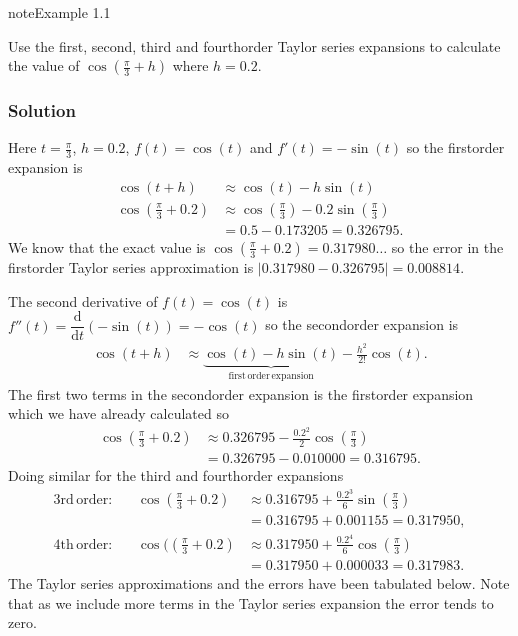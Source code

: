 \documentclass[letterpaper,10pt,english]{jupyterBook}
\begin{document}
\begin{sphinxadmonition}{note}{Example 1.1}

\sphinxAtStartPar
Use the first, second, third and fourth\sphinxhyphen{}order Taylor series expansions to calculate the value of \(\cos\left(\frac{\pi}{3} + h\right)\) where \(h=0.2\).
\subsubsection*{Solution}

\sphinxAtStartPar
Here \(t=\frac{\pi}{3}\), \(h=0.2\), \(f(t) = \cos(t)\) and \(f'(t) = -\sin(t)\) so the first\sphinxhyphen{}order expansion is
\begin{align*}
    \cos(t + h) &\approx \cos(t) - h \sin(t) \\
    \cos\left(\frac{\pi}{3} + 0.2 \right) &\approx \cos\left(\frac{\pi}{3}\right) - 0.2 \sin\left(\frac{\pi}{3}\right)
    \\
    &= 0.5 - 0.173205 = 0.326795.
\end{align*}
\sphinxAtStartPar
We know that the exact value is \(\cos(\frac{\pi}{3} + 0.2) = 0.317980\ldots\) so the error in the first\sphinxhyphen{}order Taylor series approximation is \(|0.317980 - 0.326795| = 0.008814\).

\sphinxAtStartPar
The second derivative of \(f(t) = \cos(t)\) is \(f''(t) = \dfrac{\mathrm{d}}{\mathrm{d}t}(-\sin(t)) = -\cos(t)\) so the second\sphinxhyphen{}order expansion is
\begin{align*}
    \cos(t + h) &\approx \underbrace{\cos(t) - h \sin(t)}_{\mathrm{first\,order\,expansion}} - \frac{h^2}{2!} \cos(t).
\end{align*}
\sphinxAtStartPar
The first two terms in the second\sphinxhyphen{}order expansion is the first\sphinxhyphen{}order expansion which we have already calculated so
\begin{align*}
    \cos\left(\frac{\pi}{3} + 0.2 \right) &\approx 0.326795 - \frac{0.2^2}{2} \cos\left(\frac{\pi}{3}\right) \\
    &= 0.326795 - 0.010000 = 0.316795.
\end{align*}
\sphinxAtStartPar
Doing similar for the third and fourth\sphinxhyphen{}order expansions
\begin{align*}
    \mathrm{3rd\,order}: && \cos\left(\frac{\pi}{3} + 0.2 \right) &\approx 0.316795 + \frac{0.2^3}{6} \sin\left(\frac{\pi}{3}\right) \\
    &&& = 0.316795 + 0.001155 = 0.317950, \\
    \mathrm{4th\,order}: && \cos(\left(\frac{\pi}{3} + 0.2 \right) &\approx 0.317950 + \frac{0.2^4}{6} \cos\left(\frac{\pi}{3}\right) \\
    &&& = 0.317950 + 0.000033 = 0.317983.
\end{align*}
\sphinxAtStartPar
The Taylor series approximations and the errors have been tabulated below. Note that as we include more terms in the Taylor series expansion the error tends to zero.



\end{sphinxadmonition}
\end{document}

